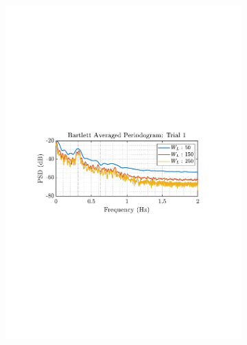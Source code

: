\documentclass[12pt]{article}
\begin{document}
\begin{figure}[H]
		\begin{subfigure}{0.49\textwidth}
			\centering
			\includegraphics[trim={2.2cm 11cm 3.15cm  11.2cm}, clip, width=\textwidth]{../MATLAB/figures/q1_5a_fig04.pdf} 
		\end{subfigure}
		\begin{subfigure}{0.49\textwidth}
			\centering

\end{subfigure}
\end{figure}
\end{document}
